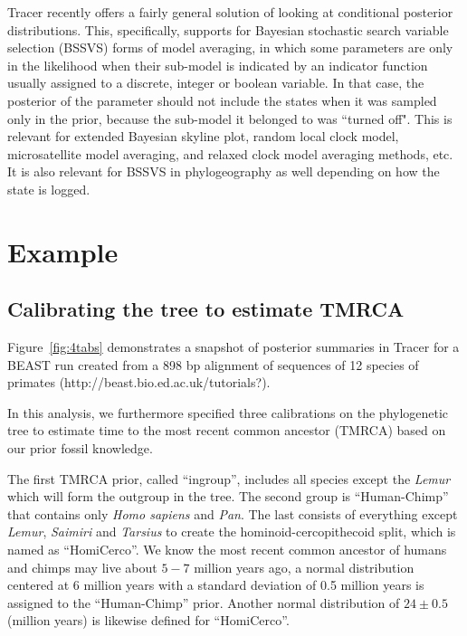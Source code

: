 \documentclass{bioinfo}
\begin{document}
Tracer recently offers a fairly general solution of looking at conditional posterior distributions. This, specifically, supports for Bayesian stochastic search variable selection (BSSVS) forms of model averaging, in which some parameters are only in the likelihood when their sub-model is indicated by an indicator function usually assigned to a discrete, integer or boolean variable. In that case, the posterior of the parameter should not include the states when it was sampled only in the prior, because the sub-model it belonged to was ``turned off". This is relevant for extended Bayesian skyline plot, random local clock model, microsatellite model averaging, and relaxed clock model averaging methods, etc. It is also relevant for BSSVS in phylogeography as well depending on how the state is logged.


\section*{Example}


\subsection*{Calibrating the tree to estimate TMRCA}

Figure~\ref{fig:4tabs} demonstrates a snapshot of posterior summaries in Tracer for a BEAST \citep{drummond2007beast} run created from a 898 bp alignment of sequences of 12 species of primates (http://beast.bio.ed.ac.uk/tutorials?). %

In this analysis, we furthermore specified three calibrations on the phylogenetic tree to estimate time to the most recent common ancestor (TMRCA) based on our prior fossil knowledge.

The first TMRCA prior, called ``ingroup'', includes all species except the \textit{Lemur} which will form the outgroup in the tree. %
The second group is ``Human-Chimp'' that contains only \textit{Homo sapiens} and \textit{Pan}.
The last consists of everything except \textit{Lemur}, \textit{Saimiri} and \textit{Tarsius} to create the hominoid-cercopithecoid split, which is named as ``HomiCerco''.
We know the most recent common ancestor of humans and chimps may live about $5-7$ million years ago, a normal distribution centered at 6 million years with a standard deviation of 0.5 million years is assigned to the ``Human-Chimp'' prior.
Another normal distribution of $24 \pm 0.5$ (million years) is likewise defined for ``HomiCerco''.
\end{document}
